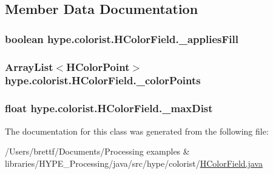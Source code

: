 \subsection{Member Data Documentation}
\hypertarget{classhype_1_1colorist_1_1_h_color_field_ade8032b9b41ab7a1d2cd62b43c890167}{
\subsubsection[{\-\_\-applies\-Fill}]{\setlength{\rightskip}{0pt plus 5cm}boolean hype.\-colorist.\-H\-Color\-Field.\-\_\-applies\-Fill\hspace{0.3cm}{\ttfamily [protected]}}}\label{classhype_1_1colorist_1_1_h_color_field_ade8032b9b41ab7a1d2cd62b43c890167}
\hypertarget{classhype_1_1colorist_1_1_h_color_field_a3405873de28ef44d2f8bce4770202048}{
\subsubsection[{\-\_\-color\-Points}]{\setlength{\rightskip}{0pt plus 5cm}Array\-List$<$H\-Color\-Point$>$ hype.\-colorist.\-H\-Color\-Field.\-\_\-color\-Points\hspace{0.3cm}{\ttfamily [protected]}}}\label{classhype_1_1colorist_1_1_h_color_field_a3405873de28ef44d2f8bce4770202048}
\hypertarget{classhype_1_1colorist_1_1_h_color_field_a49741a866fdcc404a396cb387d04b7eb}{
\subsubsection[{\-\_\-max\-Dist}]{\setlength{\rightskip}{0pt plus 5cm}float hype.\-colorist.\-H\-Color\-Field.\-\_\-max\-Dist\hspace{0.3cm}{\ttfamily [protected]}}}\label{classhype_1_1colorist_1_1_h_color_field_a49741a866fdcc404a396cb387d04b7eb}


The documentation for this class was generated from the following file\-:\begin{DoxyCompactItemize}
\item 
/\-Users/brettf/\-Documents/\-Processing examples \& libraries/\-H\-Y\-P\-E\-\_\-\-Processing/java/src/hype/colorist/\hyperlink{_h_color_field_8java}{H\-Color\-Field.\-java}\end{DoxyCompactItemize}
